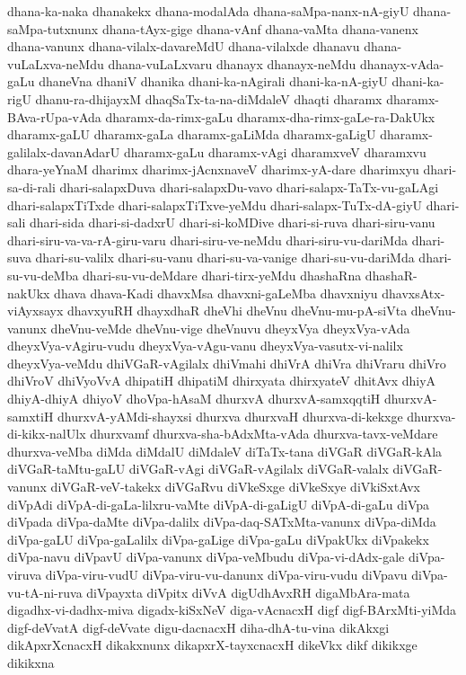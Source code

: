 {dhana-ka-naka
dhanakekx
dhana-modalAda
dhana-saMpa-nanx-nA-giyU
dhana-saMpa-tutxnunx
dhana-tAyx-gige
dhana-vAnf
dhana-vaMta
dhana-vanenx
dhana-vanunx
dhana-vilalx-davareMdU
dhana-vilalxde
dhanavu
dhana-vuLaLxva-neMdu
dhana-vuLaLxvaru
dhanayx
dhanayx-neMdu
dhanayx-vAda-gaLu
dhaneVna
dhaniV
dhanika
dhani-ka-nAgirali
dhani-ka-nA-giyU
dhani-ka-rigU
dhanu-ra-dhijayxM
dhaqSaTx-ta-na-diMdaleV
dhaqti
dharamx
dharamx-BAva-rUpa-vAda
dharamx-da-rimx-gaLu
dharamx-dha-rimx-gaLe-ra-DakUkx
dharamx-gaLU
dharamx-gaLa
dharamx-gaLiMda
dharamx-gaLigU
dharamx-galilalx-davanAdarU
dharamx-gaLu
dharamx-vAgi
dharamxveV
dharamxvu
dhara-yeYnaM
dharimx
dharimx-jAcnxnaveV
dharimx-yA-dare
dharimxyu
dhari-sa-di-rali
dhari-salapxDuva
dhari-salapxDu-vavo
dhari-salapx-TaTx-vu-gaLAgi
dhari-salapxTiTxde
dhari-salapxTiTxve-yeMdu
dhari-salapx-TuTx-dA-giyU
dhari-sali
dhari-sida
dhari-si-dadxrU
dhari-si-koMDive
dhari-si-ruva
dhari-siru-vanu
dhari-siru-va-va-rA-giru-varu
dhari-siru-ve-neMdu
dhari-siru-vu-dariMda
dhari-suva
dhari-su-valilx
dhari-su-vanu
dhari-su-va-vanige
dhari-su-vu-dariMda
dhari-su-vu-deMba
dhari-su-vu-deMdare
dhari-tirx-yeMdu
dhashaRna
dhashaR-nakUkx
dhava
dhava-Kadi
dhavxMsa
dhavxni-gaLeMba
dhavxniyu
dhavxsAtx-viAyxsayx
dhavxyuRH
dhayxdhaR
dheVhi
dheVnu
dheVnu-mu-pA-siVta
dheVnu-vanunx
dheVnu-veMde
dheVnu-vige
dheVnuvu
dheyxVya
dheyxVya-vAda
dheyxVya-vAgiru-vudu
dheyxVya-vAgu-vanu
dheyxVya-vasutx-vi-nalilx
dheyxVya-veMdu
dhiVGaR-vAgilalx
dhiVmahi
dhiVrA
dhiVra
dhiVraru
dhiVro
dhiVroV
dhiVyoVvA
dhipatiH
dhipatiM
dhirxyata
dhirxyateV
dhitAvx
dhiyA
dhiyA-dhiyA
dhiyoV
dhoVpa-hAsaM
dhurxvA
dhurxvA-samxqqtiH
dhurxvA-samxtiH
dhurxvA-yAMdi-shayxsi
dhurxva
dhurxvaH
dhurxva-di-kekxge
dhurxva-di-kikx-nalUlx
dhurxvamf
dhurxva-sha-bAdxMta-vAda
dhurxva-tavx-veMdare
dhurxva-veMba
diMda
diMdalU
diMdaleV
diTaTx-tana
diVGaR
diVGaR-kAla
diVGaR-taMtu-gaLU
diVGaR-vAgi
diVGaR-vAgilalx
diVGaR-valalx
diVGaR-vanunx
diVGaR-veV-takekx
diVGaRvu
diVkeSxge
diVkeSxye
diVkiSxtAvx
diVpAdi
diVpA-di-gaLa-lilxru-vaMte
diVpA-di-gaLigU
diVpA-di-gaLu
diVpa
diVpada
diVpa-daMte
diVpa-dalilx
diVpa-daq-SATxMta-vanunx
diVpa-diMda
diVpa-gaLU
diVpa-gaLalilx
diVpa-gaLige
diVpa-gaLu
diVpakUkx
diVpakekx
diVpa-navu
diVpavU
diVpa-vanunx
diVpa-veMbudu
diVpa-vi-dAdx-gale
diVpa-viruva
diVpa-viru-vudU
diVpa-viru-vu-danunx
diVpa-viru-vudu
diVpavu
diVpa-vu-tA-ni-ruva
diVpayxta
diVpitx
diVvA
digUdhAvxRH
digaMbAra-mata
digadhx-vi-dadhx-miva
digadx-kiSxNeV
diga-vAcnacxH
digf
digf-BArxMti-yiMda
digf-deVvatA
digf-deVvate
digu-dacnacxH
diha-dhA-tu-vina
dikAkxgi
dikApxrXcnacxH
dikakxnunx
dikapxrX-tayxcnacxH
dikeVkx
dikf
dikikxge
dikikxna
}
